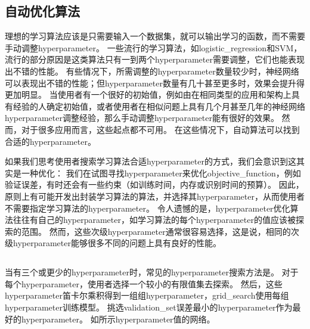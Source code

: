\subsection{自动优化算法}
\label{sec:automatic_hyperparameter_optimization_algorithms}
理想的学习算法应该是只需要输入一个数据集，就可以输出学习的函数，而不需要手动调整\gls{hyperparameter}。
一些流行的学习算法，如\gls{logistic_regression}和\gls{SVM}，流行的部分原因是这类算法只有一到两个\gls{hyperparameter}需要调整，它们也能表现出不错的性能。
有些情况下，所需调整的\gls{hyperparameter}数量较少时，神经网络可以表现出不错的性能；但\gls{hyperparameter}数量有几十甚至更多时，效果会提升得更加明显。
当使用者有一个很好的初始值，例如由在相同类型的应用和架构上具有经验的人确定初始值，或者使用者在相似问题上具有几个月甚至几年的神经网络\gls{hyperparameter}调整经验，那么手动调整\gls{hyperparameter}能有很好的效果。%
然而，对于很多应用而言，这些起点都不可用。
在这些情况下，自动算法可以找到合适的\gls{hyperparameter}。


如果我们思考使用者搜索学习算法合适\gls{hyperparameter}的方式，我们会意识到这其实是一种优化：
我们在试图寻找\gls{hyperparameter}来优化\gls{objective_function}，例如验证误差，有时还会有一些约束（如训练时间，内存或识别时间的预算）。
因此，原则上有可能开发出封装学习算法的算法，并选择其\gls{hyperparameter}，从而使用者不需要指定学习算法的\gls{hyperparameter}。
令人遗憾的是，\gls{hyperparameter}优化算法往往有自己的\gls{hyperparameter}，如学习算法的每个\gls{hyperparameter}的值应该被探索的范围。
然而，这些次级\gls{hyperparameter}通常很容易选择，这是说，相同的次级\gls{hyperparameter}能够很多不同的问题上具有良好的性能。


\subsection{}
\label{sec:grid_search}
当有三个或更少的\gls{hyperparameter}时，常见的\gls{hyperparameter}搜索方法是。
对于每个\gls{hyperparameter}，使用者选择一个较小的有限值集去探索。
然后，这些\gls{hyperparameter}笛卡尔乘积得到一组组\gls{hyperparameter}，\gls{grid_search}使用每组\gls{hyperparameter}训练模型。
挑选\gls{validation_set}误差最小的\gls{hyperparameter}作为最好的\gls{hyperparameter}。
如所示\gls{hyperparameter}值的网络。


